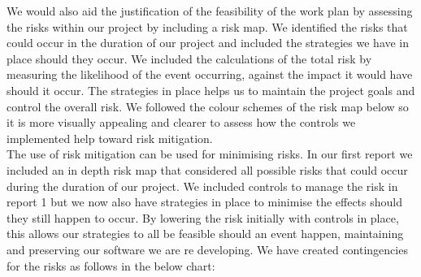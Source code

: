 We would also aid the justification of the feasibility of the  work plan by assessing the risks within our project by including a risk map. We identified the risks that could occur in the duration of our project and included the strategies we have in place should they occur. We included the calculations of the total risk by measuring the likelihood of the event occurring, against the impact it would have should it occur. The strategies in place helps us to maintain the project goals and control the overall risk. We followed the colour schemes of the risk map below so it is more visually appealing and clearer to assess how the controls we implemented help toward risk mitigation. \\



The use of risk mitigation can be used for minimising risks. In our first report we included an in depth risk map that considered all possible risks that could occur during the duration of our project. We included controls to manage the risk in report 1 but we now also have strategies in place to minimise the effects should they still happen to occur. By lowering the risk initially with controls in place, this allows our strategies to all be feasible should an event happen, maintaining and preserving our software we are re developing. We have created contingencies for the risks as follows in the below chart: \\   

 



